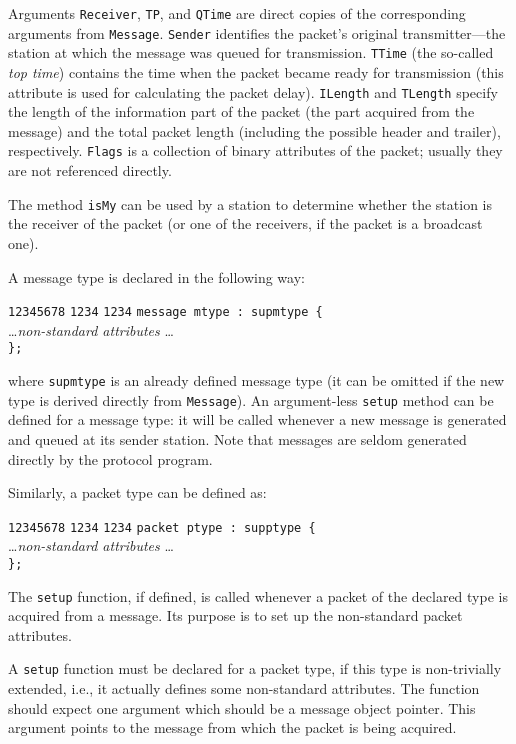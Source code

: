 Arguments {\tt Receiver}, {\tt TP}, and {\tt QTime} are direct copies of the
corresponding arguments from {\tt Message}.
{\tt Sender} identifies the packet's original
transmitter---the station at which the message was queued for
transmission.
{\tt TTime} (the so-called {\em top time\/}) contains the time when the packet
became ready for transmission (this attribute is used for calculating the
packet delay).
{\tt ILength} and {\tt TLength} specify the length of the information part
of the packet (the part acquired from the message) and the total packet length
(including the possible header and trailer), respectively.
{\tt Flags} is a collection of binary attributes of the packet; usually
they are not referenced directly.

The method {\tt isMy} can be used by a station to determine whether
the station
is the receiver of the packet (or one of the receivers, if the packet is
a broadcast one).

A message type is declared in the following way:
{\small
\begin{tabbing}
{\tt 12345678} \= {\tt 1234} \= {\tt 1234} \kill
\> {\tt message mtype : supmtype \{} \\
\> \> \ldots {\em non-standard attributes} \ldots \\
\> {\tt \};}
\end{tabbing} }
\noindent
where {\tt supmtype} is an already defined message type (it can be omitted
if the new type is derived directly from {\tt Message}).
An argument-less {\tt setup} method can be defined for a message type: it
will be called
whenever a new message is generated and queued at its sender station.
Note that messages are seldom generated directly by the protocol program.

Similarly, a packet type can be defined as:
{\small
\begin{tabbing}
{\tt 12345678} \= {\tt 1234} \= {\tt 1234} \kill
\> {\tt packet ptype : supptype \{} \\
\> \> \ldots {\em non-standard attributes} \ldots \\
\> {\tt \};}
\end{tabbing} }

The {\tt setup} function, if defined, is called whenever a packet of the
declared type is acquired from a message.
Its purpose is to set up the non-standard packet attributes.

A {\tt setup} function must be declared for a packet type, if this
type is non-trivially extended, i.e.,
it actually defines some non-standard attributes.
The function should expect one argument which should be a message
object pointer.
This argument points to the message from which the packet is being
acquired.

